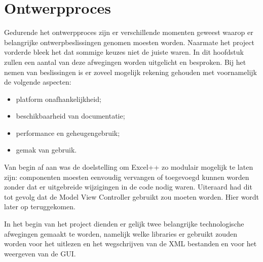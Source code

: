 \documentclass[a4paper,11pt,titlepage]{scrartcl}
\begin{document}
\newpage\section{Ontwerpproces}
Gedurende het ontwerpproces zijn er verschillende momenten geweest waarop er belangrijke ontwerpbeslissingen genomen moesten worden. Naarmate het project vorderde bleek het dat sommige keuzes niet de juiste waren. In dit hoofdstuk zullen een aantal van deze afwegingen worden uitgelicht en besproken. Bij het nemen van beslissingen is er zoveel mogelijk rekening gehouden met voornamelijk de volgende aspecten:
\begin{itemize}
	\item platform onafhankelijkheid;
	\item beschikbaarheid van documentatie;
	\item performance en geheugengebruik;
	\item gemak van gebruik.
\end{itemize}

Van begin af aan was de doelstelling om Excel++ zo modulair mogelijk te laten zijn: componenten moesten eenvoudig vervangen of toegevoegd kunnen worden zonder dat er uitgebreide wijzigingen in de code nodig waren. Uiteraard had dit tot gevolg dat de Model View Controller gebruikt zou moeten worden. Hier wordt later op teruggekomen.

In het begin van het project dienden er gelijk twee belangrijke technologische afwegingen gemaakt te worden, namelijk welke libraries er gebruikt zouden worden voor het uitlezen en het wegschrijven van de XML bestanden en voor het weergeven van de GUI.\\
\end{document}
